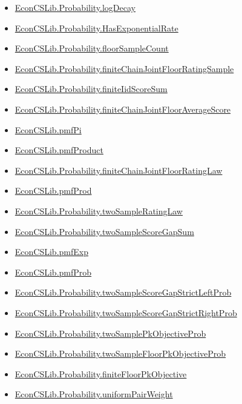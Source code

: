 \documentclass[10pt]{article}
\begin{document}
\begin{itemize}[leftmargin=1.2em]
\begin{itemize}[leftmargin=1.2em]
\item \hyperlink{library-prerequisite-94743506c5de049b}{EconCSLib.Probability.logDecay}
\item \hyperlink{library-prerequisite-380666720005662c}{EconCSLib.Probability.HasExponentialRate}
\item \hyperlink{library-prerequisite-f584f3b3a668a101}{EconCSLib.Probability.floorSampleCount}
\item \hyperlink{library-prerequisite-1ea7df0bc503026f}{EconCSLib.Probability.finiteChainJointFloorRatingSample}
\item \hyperlink{library-prerequisite-e0e20858ab2c39b5}{EconCSLib.Probability.finiteIidScoreSum}
\item \hyperlink{library-prerequisite-2aef56ecee620200}{EconCSLib.Probability.finiteChainJointFloorAverageScore}
\item \hyperlink{library-prerequisite-b9805c0fe3b56f02}{EconCSLib.pmfPi}
\item \hyperlink{library-prerequisite-38eb9a31a47bfbd9}{EconCSLib.pmfProduct}
\item \hyperlink{library-prerequisite-3a33b3f1236ded5c}{EconCSLib.Probability.finiteChainJointFloorRatingLaw}
\item \hyperlink{library-prerequisite-f185c8e6394c9317}{EconCSLib.pmfProd}
\item \hyperlink{library-prerequisite-59131a14024b99ca}{EconCSLib.Probability.twoSampleRatingLaw}
\item \hyperlink{library-prerequisite-0777cfce9fa4aa84}{EconCSLib.Probability.twoSampleScoreGapSum}
\item \hyperlink{library-prerequisite-e5c7eedc40c11b7a}{EconCSLib.pmfExp}
\item \hyperlink{library-prerequisite-7fec9dedef722fc8}{EconCSLib.pmfProb}
\item \hyperlink{library-prerequisite-7977d3effede269a}{EconCSLib.Probability.twoSampleScoreGapStrictLeftProb}
\item \hyperlink{library-prerequisite-04cfd6035ff6b93b}{EconCSLib.Probability.twoSampleScoreGapStrictRightProb}
\item \hyperlink{library-prerequisite-b651d97033f09c68}{EconCSLib.Probability.twoSamplePkObjectiveProb}
\item \hyperlink{library-prerequisite-94a7fcd88ae8a6e8}{EconCSLib.Probability.twoSampleFloorPkObjectiveProb}
\item \hyperlink{library-prerequisite-f95d596e14b1998c}{EconCSLib.Probability.finiteFloorPkObjective}
\item \hyperlink{library-prerequisite-5e9579cf8dd8972a}{EconCSLib.Probability.uniformPairWeight}

\end{itemize}
\end{itemize}
\end{document}
